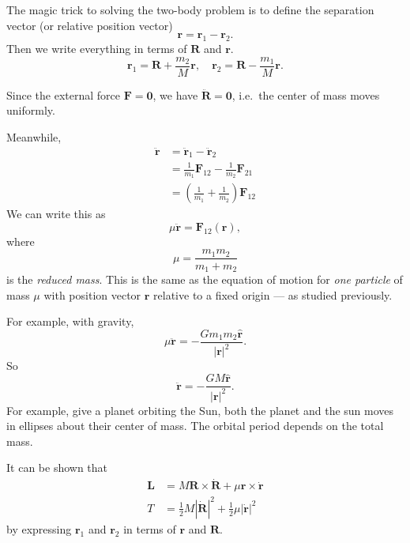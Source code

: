 \documentclass[a4paper]{article}
\begin{document}
The magic trick to solving the two-body problem is to define the separation vector (or relative position vector)
\[
  \mathbf{r} = \mathbf{r}_1 - \mathbf{r}_2.
\]
Then we write everything in terms of $\mathbf{R}$ and $\mathbf{r}$.
\[
  \mathbf{r}_1 = \mathbf{R} + \frac{m_2}{M}\mathbf{r},\quad \mathbf{r}_2 = \mathbf{R} - \frac{m_1}{M}\mathbf{r}.
\]
\begin{center}
\end{center}
Since the external force $\mathbf{F} = \mathbf{0}$, we have $\ddot{\mathbf{R}} = \mathbf{0}$, i.e.\ the center of mass moves uniformly.

Meanwhile,
\begin{align*}
  \ddot{\mathbf{r}} &= \ddot{\mathbf{r}}_1 - \ddot{\mathbf{r}}_2\\
  &= \frac{1}{m_1} \mathbf{F}_{12} - \frac{1}{m_2}\mathbf{F}_{21}\\
  &= \left(\frac{1}{m_1} + \frac{1}{m_2}\right) \mathbf{F}_{12}
\end{align*}
We can write this as
\[
  \mu \ddot{\mathbf{r}} = \mathbf{F}_{12}(\mathbf{r}),
\]
where
\[
  \mu = \frac{m_1m_2}{m_1 + m_2}
\]
is the \emph{reduced mass}. This is the same as the equation of motion for \emph{one particle} of mass $\mu$ with position vector $\mathbf{r}$ relative to a fixed origin --- as studied previously.

For example, with gravity,
\[
  \mu \ddot{\mathbf{r}} = -\frac{Gm_1m_2 \hat{\mathbf{r}}}{|\mathbf{r}|^2}.
\]
So
\[
  \ddot{\mathbf{r}} = -\frac{GM\hat{\mathbf{r}}}{|\mathbf{r}|^2}.
\]
For example, give a planet orbiting the Sun, both the planet and the sun moves in ellipses about their center of mass. The orbital period depends on the total mass.

It can be shown that
\begin{align*}
  \mathbf{L} &= M\mathbf{R} \times \dot{\mathbf{R}} + \mu \mathbf{r}\times \dot{\mathbf{r}}\\
  T &= \frac{1}{2} M|\dot{\mathbf{R}}|^2 + \frac{1}{2}\mu |\dot{\mathbf{r}}|^2
\end{align*}
by expressing $\mathbf{r}_1$ and $\mathbf{r}_2$ in terms of $\mathbf{r}$ and $\mathbf{R}$.
\end{document}
